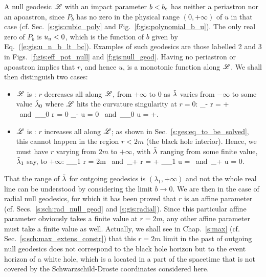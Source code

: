 A null geodesic $\mathscr{L}$ with an impact parameter $b < b_{\rm c}$ has neither
a periastron nor an apoastron, since $P_b$ has no zero in the physical range
$(0, +\infty)$ of $u$ in that
case (cf. Sec.~\ref{s:gis:cubic_poly} and Fig.~\ref{f:gis:polynomial_b_u}).
The only real zero of $P_b$ is $u_{\rm n}<0$, which is the function of $b$
given by Eq.~(\ref{e:gis:u_n_b_lt_bc}).
Examples of such geodesics are those labelled 2 and 3
in Figs.~\ref{f:gis:eff_pot_null} and \ref{f:gis:null_geod}.
Having no periastron or apoastron implies that $r$, and hence $u$, is a
monotonic function along $\mathscr{L}$.
We shall then distinguish two cases:
\begin{itemize}
\item $\mathscr{L}$ is : $r$ decreases all along $\mathscr{L}$, from $+\infty$ to $0$ as ${\tilde\lambda}$
varies from $-\infty$ to some value ${\tilde\lambda}_0$ where $\mathscr{L}$ hits the curvature
singularity at $r=0$:
\be
    \lim_{\tlamb\to -\infty} r = + \infty
    \ \mbox{and}\
    \lim_{\tlamb\to \tlamb_0} r = 0
    \quad \iff\quad
    \lim_{\tlamb\to -\infty} u = 0
    \ \mbox{and}\
    \lim_{\tlamb\to \tlamb_0} u = +\infty.
\ee
\item $\mathscr{L}$ is : $r$ increases all along $\mathscr{L}$; as shown in Sec.~\ref{s:ges:eq_to_be_solved}, this cannot happen in the region $r<2m$ (the black
hole interior). Hence, we must have $r$ varying from $2m$ to $+\infty$,
with ${\tilde\lambda}$ ranging from some finite value, ${\tilde\lambda}_1$ say, to $+\infty$:
\be
    \lim_{\tlamb\to \tlamb_1} r = 2m
    \ \mbox{and}\
    \lim_{\tlamb\to +\infty} r = +\infty
    \quad \iff\quad
    \lim_{\tlamb\to \tlamb_1} u = 
    \ \mbox{and}\
    \lim_{\tlamb\to +\infty} u = 0.
\ee
\end{itemize}
That the range of ${\tilde\lambda}$ for outgoing geodesics is $(\lambda_1, +\infty)$
and not the whole real line can be understood by considering the limit
$b\to 0$. We are then in the case of radial null geodesics, for which it has
been proved that $r$ is an affine parameter (cf. Secs.~\ref{s:sch:rad_null_geod}
and \ref{s:gis:radial}).
Since this particular affine parameter obviously takes a finite value at $r=2m$,
any other affine parameter must take a finite value as well.
Actually, we shall see in Chap.~\ref{s:max} (cf. Sec.~\ref{s:sch:max_extens_constr})
that this $r=2m$ limit in the
past of outgoing null geodesics does not correspond to the black hole horizon
but to the event horizon of a white hole, which is a located in a part of
the spacetime that is not covered by the Schwarzschild-Droste coordinates
considered here.

